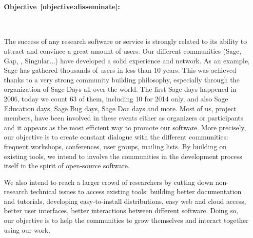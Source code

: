 \documentclass[noworkareas,deliverables,gitinfo,compactht]{euproposal}
\begin{document}
\begin{proposal}
\paragraph{Objective~\ref{objective:disseminate}: }\ 

The success of any research software or service is strongly related to its ability to attract and convince a great amount of users. Our different communities (Sage, Gap, \PariGP, Singular...) have developed a solid experience and network. As an example, Sage has gathered thousands of users in less than 10 years. This was achieved thanks to a very strong community building philosophy, especially through the organization of Sage-Days all over the world. The first Sage-days happened in 2006, today we count 63 of them, including 10 for 2014 only, and also Sage Education days, Sage Bug days, Sage Doc days and more. Most of us, \TheProject{} project members, have been involved in these events either as organizers or participants and it appears as the most efficient way to promote our software. More precisely, our objective is to create constant dialogue with the different communities: frequent workshops, conferences, user groups, mailing lists. By building on existing tools, we intend to involve the communities in the development process itself in the spirit of open-source software. 

We also intend to reach a larger crowd of researchers by cutting down non-research technical issues to access existing tools: building better documentation and tutorials, developing easy-to-install distributions, easy web and cloud access, better user interfaces, better interactions between different software. Doing so, our objective is to help the communities to grow themselves and interact together using our work. 


\clearpage

\draftpage


\draftpage


\draftpage



\end{proposal}
\end{document}
